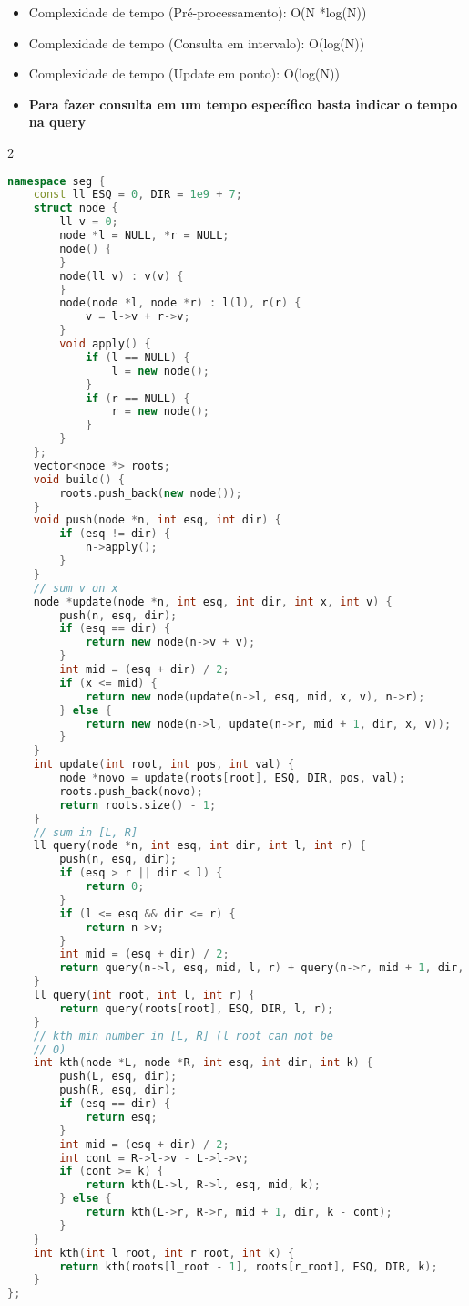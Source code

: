 \documentclass[11pt, a4paper, oneside]{book}
\begin{document}
\begin{itemize}
\item Complexidade de tempo (Pré-processamento): O(N *log(N))
\item Complexidade de tempo (Consulta em intervalo): O(log(N))
\item Complexidade de tempo (Update em ponto): O(log(N))
\item \textbf{Para fazer consulta em um tempo específico basta indicar o tempo na query}
\end{itemize}

\hfill

\begin{multicols}{2}
\begin{lstlisting}[language=C++]
namespace seg {
    const ll ESQ = 0, DIR = 1e9 + 7;
    struct node {
        ll v = 0;
        node *l = NULL, *r = NULL;
        node() {
        }
        node(ll v) : v(v) {
        }
        node(node *l, node *r) : l(l), r(r) {
            v = l->v + r->v;
        }
        void apply() {
            if (l == NULL) {
                l = new node();
            }
            if (r == NULL) {
                r = new node();
            }
        }
    };
    vector<node *> roots;
    void build() {
        roots.push_back(new node());
    }
    void push(node *n, int esq, int dir) {
        if (esq != dir) {
            n->apply();
        }
    }
    // sum v on x
    node *update(node *n, int esq, int dir, int x, int v) {
        push(n, esq, dir);
        if (esq == dir) {
            return new node(n->v + v);
        }
        int mid = (esq + dir) / 2;
        if (x <= mid) {
            return new node(update(n->l, esq, mid, x, v), n->r);
        } else {
            return new node(n->l, update(n->r, mid + 1, dir, x, v));
        }
    }
    int update(int root, int pos, int val) {
        node *novo = update(roots[root], ESQ, DIR, pos, val);
        roots.push_back(novo);
        return roots.size() - 1;
    }
    // sum in [L, R]
    ll query(node *n, int esq, int dir, int l, int r) {
        push(n, esq, dir);
        if (esq > r || dir < l) {
            return 0;
        }
        if (l <= esq && dir <= r) {
            return n->v;
        }
        int mid = (esq + dir) / 2;
        return query(n->l, esq, mid, l, r) + query(n->r, mid + 1, dir, l, r);
    }
    ll query(int root, int l, int r) {
        return query(roots[root], ESQ, DIR, l, r);
    }
    // kth min number in [L, R] (l_root can not be
    // 0)
    int kth(node *L, node *R, int esq, int dir, int k) {
        push(L, esq, dir);
        push(R, esq, dir);
        if (esq == dir) {
            return esq;
        }
        int mid = (esq + dir) / 2;
        int cont = R->l->v - L->l->v;
        if (cont >= k) {
            return kth(L->l, R->l, esq, mid, k);
        } else {
            return kth(L->r, R->r, mid + 1, dir, k - cont);
        }
    }
    int kth(int l_root, int r_root, int k) {
        return kth(roots[l_root - 1], roots[r_root], ESQ, DIR, k);
    }
};
\end{lstlisting}
\end{multicols}
\end{document}

